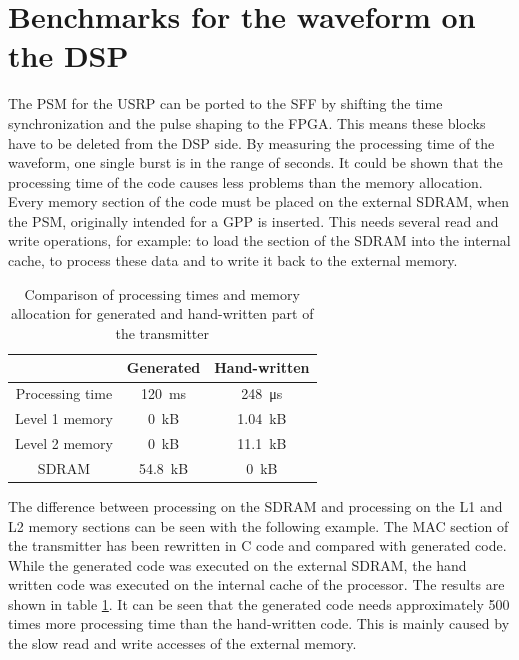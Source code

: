 \section{Benchmarks for the waveform on the DSP}
\label{sec:bench_dsp}
The \ac{PSM} for the USRP can be ported to the SFF by shifting the time synchronization and the pulse shaping to the FPGA. This means these blocks have to be deleted from the DSP side. By measuring the processing time of the waveform, one single burst is in the range of seconds. It could be shown that the processing time of the code causes less problems than the memory allocation. Every memory section of the code must be placed on the external SDRAM, when the \ac{PSM}, originally intended for a \ac{GPP} is inserted. This needs several read and write operations, for example: to load the section of the SDRAM into the internal cache, to process these data and to write it back to the external memory.


\begin{table}[h]
\centering
\begin{tabular}{c|cc}
\toprule
 			& Generated & Hand-written \\
 \midrule
 Processing time			& \SI{120}{ms}	& \SI{248}{\micro s}	\\
 Level 1 memory 	& \SI{0}{kB}		& \SI{1.04}{kB} \\
 Level 2 memory 	& \SI{0}{kB}		& \SI{11.1}{kB} \\
 SDRAM						& \SI{54.8}{kB}	& \SI{0}{kB} \\
 \bottomrule			
\end{tabular}
\caption{Comparison of processing times and memory allocation for generated and hand-written part of the transmitter}
\label{tab:mac_tch_bench}
\end{table}


The difference between processing on the SDRAM and processing on the L1 and L2 memory sections can be seen with the following example. The MAC section of the transmitter has been rewritten in C code and compared with generated code. While the generated code was executed on the external SDRAM, the hand written code was executed on the internal cache of the processor. The results are shown in table \ref{tab:mac_tch_bench}. It can be seen that the generated code needs approximately 500 times more processing time than the hand-written code. This is mainly caused by the slow read and write accesses of the external memory.

